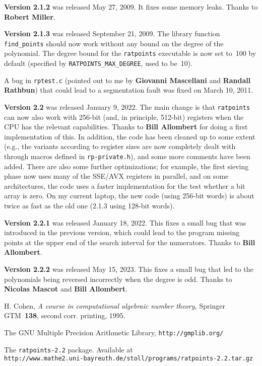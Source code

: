 \documentclass[12pt,a4paper,oneside]{amsart}
\newcommand{\rpversion}{2.2} %
\begin{document}
\textbf{Version 2.1.2} was released May 27, 2009. It fixes some memory leaks.
Thanks to \textbf{Robert Miller}.

\textbf{Version 2.1.3} was released September 21, 2009. The library function
\verb+find_points+ should now work without any bound on the degree of the
polynomial. The degree bound for the \texttt{ratpoints} executable is now set
to~100 by default (specified by \verb+RATPOINTS_MAX_DEGREE+, used to be~10).

A bug in \texttt{rptest.c} (pointed out to me by \textbf{Giovanni Mascellani}
and \textbf{Randall Rathbun}) that could lead to a segmentation fault was fixed on
March 10, 2011.

\textbf{Version 2.2} was released January 9, 2022. The main change is that
\texttt{ratpoints} can now also work with 256-bit (and, in principle, 512-bit)
registers when the CPU has the relevant capabilities. Thanks to
\textbf{Bill Allombert} for doing a first implementation of this. In addition,
the code has been cleaned up to some extent (e.g., the variants according
to register sizes are now completely dealt with through macros defined
in \texttt{rp-private.h}), and some more comments have been added.
There are also some further optimizations; for example, the first sieving
phase now uses many of the SSE/AVX registers in parallel, and on some
architectures, the code uses a faster implementation for the test whether
a bit array is zero. On my current laptop, the new code (using 256-bit words)
is about twice as fast as the old one (2.1.3 using 128-bit words).

\textbf{Version 2.2.1} was released January 18, 2022. This fixes a small
bug that was introduced in the previous version, which could lead to
the program missing points at the upper end of the search interval
for the numerators. Thanks to \textbf{Bill Allombert}.

\textbf{Version 2.2.2} was released May 15, 2023. This fixes a small
bug that led to the polynomials being reversed incorrectly when the
degree is odd. Thanks to \textbf{Nicolas Mascot} and \textbf{Bill Allombert}.


\begin{thebibliography}{gmp}
\frenchspacing

  H. Cohen, \textit{A course in computational algebraic number theory,}
  Springer GTM~\textbf{138}, second corr. printing, 1995.

  The GNU Multiple Precision Arithmetic Library, \texttt{http://gmplib.org/}

  The \texttt{ratpoints-\rpversion} package. Available at \\
  \texttt{http://www.mathe2.uni-bayreuth.de/stoll/programs/ratpoints-\rpversion.tar.gz}

\end{thebibliography}
\end{document}
